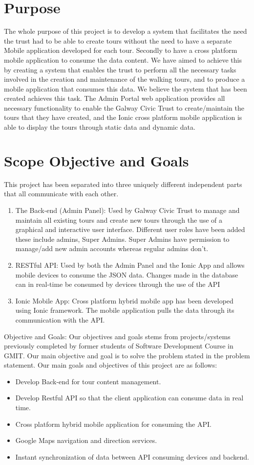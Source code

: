 	\section {Purpose}
	The whole purpose of this project is to develop a system that facilitates the need the trust had to be able to create tours without the need to have a separate Mobile application developed for each tour. Secondly to have a cross platform mobile application to consume the data content. We have aimed to achieve this by creating a system that enables the trust to perform all the necessary tasks involved in the creation and maintenance of the walking tours, and to produce a mobile application that consumes this data. We believe the system that has been created achieves this task. The Admin Portal web application provides all necessary functionality to enable the Galway Civic Trust to create/maintain the tours that they have created, and the Ionic cross platform mobile application is able to display the tours through static data and dynamic data.
	
	\section {Scope Objective and Goals}
	This project has been separated into three uniquely different independent parts that all communicate with each other. 
	\begin{enumerate}
		\item{The Back-end (Admin Panel): Used by Galway Civic Trust to manage and maintain all existing tours and create new tours through the use of a graphical and interactive user interface. Different user roles have been added these include admins, Super Admins. Super Admins have permission to manage/add new admin accounts whereas regular admins don’t.}
		\item{RESTful API: Used by both the Admin Panel and the Ionic App and allows mobile devices to consume the JSON data. Changes made in the database can in real-time be consumed by devices through the use of the API}
		\item{Ionic Mobile App: Cross platform hybrid mobile app has been developed using Ionic framework. The mobile application pulls the data through its communication with the API.}
	\end{enumerate}
	
	 Objective and Goals: Our objectives and goals stems from projects/systems previously completed by former students of Software Development Course in GMIT. Our main objective and goal is to solve the problem stated in the problem statement. Our main goals and objectives of this project are as follows:
	 \begin{itemize}
		\item Develop Back-end for tour content management.
		\item Develop Restful API so that the client application can consume data in real time. 
		\item Cross platform hybrid mobile application for consuming the API.
		\item Google Maps navigation and direction services.
		\item Instant synchronization of data  between API consuming devices and backend. 
	\end{itemize}
